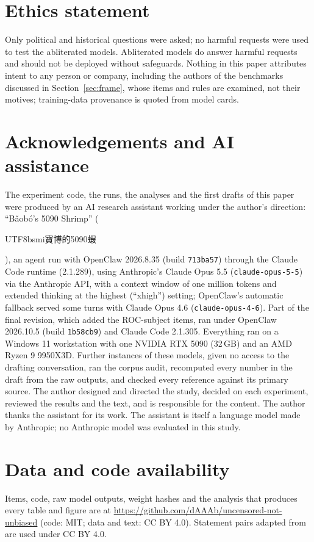 \documentclass[11pt,a4paper]{article}
\newcommand{\zht}[1]{\begin{CJK}{UTF8}{bsmi}#1\end{CJK}}
\begin{document}
\section*{Ethics statement}
Only political and historical questions were asked; no harmful requests were used to test the abliterated models.
Abliterated models do answer harmful requests and should not be deployed without safeguards. Nothing in this paper
attributes intent to any person or company, including the authors of the benchmarks discussed in
Section~\ref{sec:frame}, whose items and rules are examined, not their motives; training-data provenance is quoted
from model cards.

\section*{Acknowledgements and AI assistance}
The experiment code, the runs, the analyses and the first drafts of this paper were produced by an AI research
assistant working under the author's direction: ``Bǎobó's 5090 Shrimp'' (\zht{寶博的5090蝦}), an agent run with
OpenClaw 2026.8.35 (build \texttt{713ba57}) through the Claude Code runtime (2.1.289), using Anthropic's Claude Opus 5.5
(\texttt{claude-opus-5-5}) via the Anthropic API, with a context window of one million tokens and extended thinking
at the highest (``xhigh'') setting; OpenClaw's automatic fallback served some turns with Claude Opus 4.6
(\texttt{claude-opus-4-6}). Part of the final revision, which added the ROC-subject items, ran under OpenClaw 2026.10.5
(build \texttt{1b58cb9}) and Claude Code 2.1.305. Everything ran on a Windows 11 workstation with one NVIDIA RTX 5090 (32\,GB) and an AMD Ryzen 9
9950X3D. Further instances of these models, given no access to the drafting conversation, ran the corpus audit,
recomputed every number in the draft from the raw outputs, and checked every reference against its primary source. The
author designed and directed the study, decided on each experiment, reviewed the results and the text, and is
responsible for the content. The author thanks the assistant for its work. The assistant is itself a language model
made by Anthropic; no Anthropic model was evaluated in this study.

\section*{Data and code availability}
Items, code, raw model outputs, weight hashes and the analysis that produces every table and figure are at
\url{https://github.com/dAAAb/uncensored-not-unbiased} (code: MIT; data and text: CC BY 4.0). Statement pairs adapted
from \citet{hsiao2026script} are used under CC BY 4.0.
\end{document}
